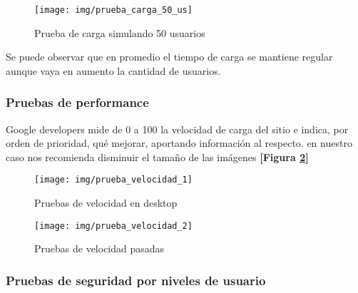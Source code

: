   \begin{figure}[h]
  	\centering
  	\texttt{[image: img/prueba\_carga\_50\_us]}
  	\caption{Prueba de carga simulando 50 usuarios}
  	\label{prueba_carga_50_us}
  \end{figure}
  
  Se puede observar que en promedio el tiempo de carga se mantiene regular aunque vaya en aumento la cantidad de usuarios.
  
  \subsubsection{Pruebas de performance}
  Google developers mide de 0 a 100 la velocidad de carga del sitio e indica, por orden de prioridad, qué mejorar, aportando información al respecto.
  en nuestro caso nos recomienda disminuir el tamaño de las imágenes \textbf{[Figura \ref{prueba_velocidad_1}]}
  
  \newpage
  
  \begin{figure}[h]
  	\centering
  	\texttt{[image: img/prueba\_velocidad\_1]}
  	\caption{Pruebas de velocidad en desktop}
  	\label{prueba_velocidad_1}
  \end{figure}
  
  \begin{figure}[h]
  	\centering
  	\texttt{[image: img/prueba\_velocidad\_2]}
  	\caption{Pruebas de velocidad pasadas}
  	\label{prueba_velocidad_2}
  \end{figure}
  \subsubsection{Pruebas de seguridad por niveles de usuario}
  
